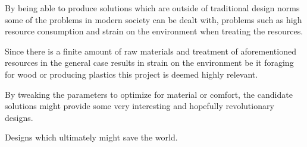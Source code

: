 By being able to produce solutions which are outside of traditional design norms some of the problems in modern society can be dealt with, problems such as high resource consumption and strain on the environment when treating the resources.

Since there is a finite amount of raw materials and treatment of aforementioned  resources in the general case results in strain on the environment be it foraging for wood or producing plastics this project is deemed highly relevant.

By tweaking the parameters to optimize for material or comfort, the candidate solutions might provide some very interesting and hopefully revolutionary designs.

Designs which ultimately might save the world.

